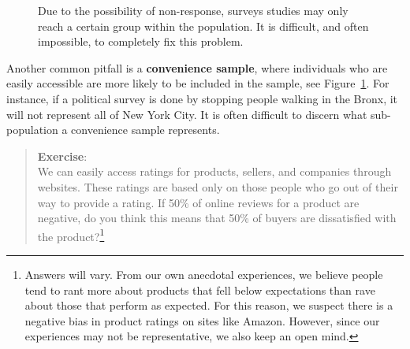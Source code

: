 \documentclass[
  letterpaper,
  DIV=11,
  numbers=noendperiod]{scrreprt}
\begin{document}
\begin{figure}


\caption{\label{fig-convsamp}Due to the possibility of non-response,
surveys studies may only reach a certain group within the population. It
is difficult, and often impossible, to completely fix this problem.}

\end{figure}%

Another common pitfall is a \textbf{convenience sample}, where
individuals who are easily accessible are more likely to be included in
the sample, see Figure~\ref{fig-convsamp}. For instance, if a political
survey is done by stopping people walking in the Bronx, it will not
represent all of New York City. It is often difficult to discern what
sub-population a convenience sample represents.

\begin{quote}
\textbf{Exercise}:\\
We can easily access ratings for products, sellers, and companies
through websites. These ratings are based only on those people who go
out of their way to provide a rating. If 50\% of online reviews for a
product are negative, do you think this means that 50\% of buyers are
dissatisfied with the product?\footnote{Answers will vary. From our own
  anecdotal experiences, we believe people tend to rant more about
  products that fell below expectations than rave about those that
  perform as expected. For this reason, we suspect there is a negative
  bias in product ratings on sites like Amazon. However, since our
  experiences may not be representative, we also keep an open mind.}
\end{quote}
\end{document}
